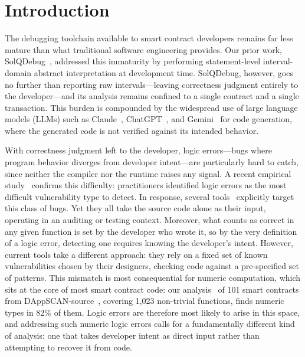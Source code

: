 \documentclass[pdflatex,sn-basic]{sn-jnl}%
\theoremstyle{thmstyleone}%
\theoremstyle{thmstyletwo}%
\theoremstyle{thmstylethree}%
\begin{document}

\maketitle

\section{Introduction}

The debugging toolchain available to smart contract developers remains far less mature than what traditional software engineering provides.
Our prior work, SolQDebug~\citep{solqdebug}, addressed this immaturity by performing statement-level interval-domain abstract interpretation at development time.
SolQDebug, however, goes no further than reporting raw intervals---leaving correctness judgment entirely to the developer---and its analysis remains confined to a single contract and a single transaction.
This burden is compounded by the widespread use of large language models (LLMs) such as Claude~\citep{claude}, ChatGPT~\citep{chatgpt}, and Gemini~\citep{gemini} for code generation, where the generated code is not verified against its intended behavior.

With correctness judgment left to the developer, logic errors---bugs where program behavior diverges from developer intent---are particularly hard to catch, since neither the compiler nor the runtime raises any signal.
A recent empirical study~\citep{defisecurity} confirms this difficulty: practitioners identified logic errors as the most difficult vulnerability type to detect.
In response, several tools~\citep{numscout, gptscan, sctype} explicitly target this class of bugs.
Yet they all take the source code alone as their input, operating in an auditing or testing context.
Moreover, what counts as correct in any given function is set by the developer who wrote it, so by the very definition of a logic error, detecting one requires knowing the developer's intent.
However, current tools take a different approach: they rely on a fixed set of known vulnerabilities chosen by their designers, checking code against a pre-specified set of patterns.
This mismatch is most consequential for numeric computation, which sits at the core of most smart contract code: our analysis~\citep{dappscananalysis} of 101 smart contracts from DAppSCAN-source~\citep{dappscan}, covering 1,023 non-trivial functions, finds numeric types in 82\% of them.
Logic errors are therefore most likely to arise in this space, and addressing such numeric logic errors calls for a fundamentally different kind of analysis: one that takes developer intent as direct input rather than attempting to recover it from code.
\end{document}
